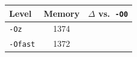 \begin{tabular*}{\columnwidth}{@{\extracolsep\fill}lcc@{\extracolsep\fill}}
\toprule
\textbf{Level} & \textbf{Memory} & \textbf{$\Delta$ vs.\ \texttt{-O0}} \\
\midrule
\texttt{-Oz} & 1374 &  \\
\texttt{-Ofast} & 1372 &  \\
\bottomrule
\end{tabular*}
